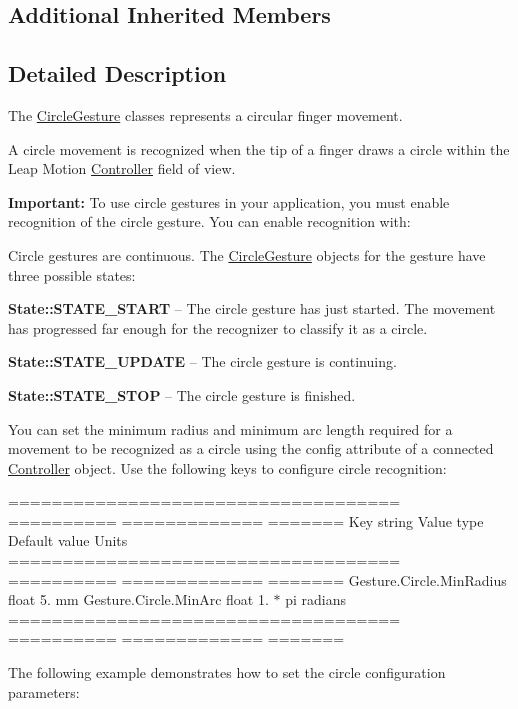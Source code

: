 \subsection*{Additional Inherited Members}


\subsection{Detailed Description}
The \hyperlink{class_leap_1_1_circle_gesture}{Circle\+Gesture} classes represents a circular finger movement.

A circle movement is recognized when the tip of a finger draws a circle within the Leap Motion \hyperlink{class_leap_1_1_controller}{Controller} field of view.



{\bfseries Important\+:} To use circle gestures in your application, you must enable recognition of the circle gesture. You can enable recognition with\+:


\begin{DoxyCodeInclude}
\end{DoxyCodeInclude}


Circle gestures are continuous. The \hyperlink{class_leap_1_1_circle_gesture}{Circle\+Gesture} objects for the gesture have three possible states\+:

{\bfseries State\+::\+S\+T\+A\+T\+E\+\_\+\+S\+T\+A\+RT} -- The circle gesture has just started. The movement has progressed far enough for the recognizer to classify it as a circle.

{\bfseries State\+::\+S\+T\+A\+T\+E\+\_\+\+U\+P\+D\+A\+TE} -- The circle gesture is continuing.

{\bfseries State\+::\+S\+T\+A\+T\+E\+\_\+\+S\+T\+OP} -- The circle gesture is finished.

You can set the minimum radius and minimum arc length required for a movement to be recognized as a circle using the config attribute of a connected \hyperlink{class_leap_1_1_controller}{Controller} object. Use the following keys to configure circle recognition\+:

==================================== ========== ============= ======= Key string Value type Default value Units ==================================== ========== ============= ======= Gesture.\+Circle.\+Min\+Radius float 5. mm Gesture.\+Circle.\+Min\+Arc float 1. $\ast$ pi radians ==================================== ========== ============= ======= 

The following example demonstrates how to set the circle configuration parameters\+:


